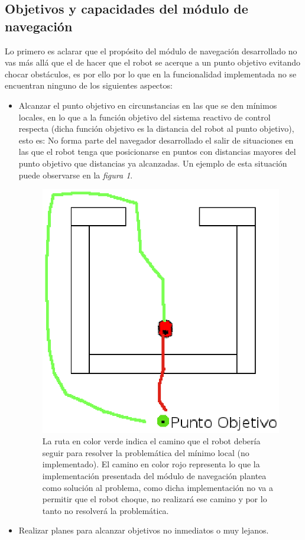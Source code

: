 \documentclass[12pt,spanish]{article}
\begin{document}
\subsection{Objetivos y capacidades del módulo de navegación}
Lo primero es aclarar que el propósito del módulo de navegación desarrollado no vas más allá que el de hacer que el robot se acerque a un punto objetivo evitando chocar obstáculos, es por ello por lo que en la funcionalidad implementada no se encuentran ninguno de los siguientes aspectos:
\begin{itemize}
	\item Alcanzar el punto objetivo en circunstancias en las que se den mínimos locales, en lo que a la función objetivo del sistema reactivo de control respecta (dicha función objetivo es la distancia del robot al punto objetivo), esto es: No forma parte del navegador desarrollado el salir de situaciones en las que el robot tenga que posicionarse en puntos con distancias mayores del punto objetivo que distancias ya alcanzadas. Un ejemplo de esta situación puede observarse en la \textit{figura 1}.
	\begin{figure}[ht]
	\includegraphics[scale=0.7]{./imagenes/minimoLocal.eps}
	\caption{La ruta en color verde indica el camino que el robot debería seguir para resolver la problemática del mínimo local (no implementado). El camino en color rojo representa lo que la implementación presentada del módulo de navegación plantea como solución al problema, como dicha implementación no va a permitir que el robot choque, no realizará ese camino y por lo tanto no resolverá la problemática.}
	\end{figure}
	\item Realizar planes para alcanzar objetivos no inmediatos o muy lejanos.
\end{itemize}
\end{document}
